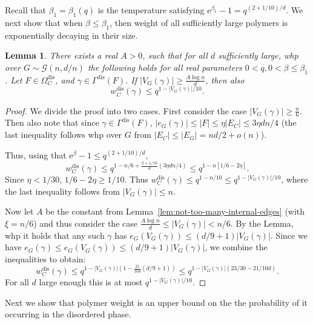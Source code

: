 \documentclass[11pt]{article}
\theoremstyle{plain}
\newtheorem{lemma}[theorem]{Lemma}
\newcommand{\G}{\mathcal{G}}
\newcommand{\emm}{\mathrm{e}}
\newcommand{\1}{\mathbb{1}}
\newcommand{\dis}{\mathrm{dis}}
\begin{document}
Recall that \(\beta_1 = \beta_1(q)\) is the temperature satisfying \(\emm^{\beta_1}-1 = q^{(2+1/10)/d}\). We next show that when \(\beta \leq \beta_1\), then weight of all sufficiently large polymers is exponentially decaying in their size. 

\begin{lemma}\label{lem:disordered-polymer-weight-decay}
    There exists a real \(A > 0\), such that for all \(d\) sufficiently large, whp over \(G\sim\G(n,d/n)\) the following holds for all real parameters \(0 <q, 0 < \beta \leq \beta_1\). Let \(F\in\Omega_C^\dis\), and \(\gamma\in\Gamma^\dis(F)\). If \(|V_G(\gamma)|\geq\frac{A\log n}{d}\), then also \[w^\dis_C(\gamma) \leq q^{1-|V_G(\gamma)|/10}.\]
\end{lemma}
\begin{proof}
    We divide the proof into two cases. First consider the case \(|V_G(\gamma)| \geq \frac{n}{6}\). Then also note that since \(\gamma\in\Gamma^\dis(F)\), \(|e_G(\gamma)|\leq |F| \leq \eta |E_C| \leq 3\eta dn / 4\) (the last inequality follows whp over \(G\) from \(|E_C|\leq|E_G| = nd/2 + o(n)\)).

    Thus, using that \(\emm^\beta-1 \leq q^{(2+1/10)/d}\),
    \[
    w^\dis_C(\gamma)\leq q^{1-n/6 + \frac{2+1/10}{d} (3\eta dn / 4)} \leq q^{1-n[1/6 - 2\eta ]}.
    \]
    Since \(\eta < 1/30\), \(1/6 - 2\eta \geq 1/10\). Thus \(w^\dis_C(\gamma)\leq q^{1-n/10}\leq q^{1-|V_G(\gamma)|/10}\), where the last inequality follows from \(|V_G(\gamma)|\leq n\).

    Now let \(A\) be the constant from Lemma~\ref{lem:not-too-many-internal-edges} (with \(\xi = n/6\)) and thus consider the case \(\frac{A\log n}{d}\leq|V_G(\gamma)| < n/6\). By the Lemma, whp it holds that any such \(\gamma\) has \(e_G(V_G(\gamma))\leq(d/9+1)|V_G(\gamma)|\).    Since we have \(e_G(\gamma) \leq e_G(V_G(\gamma)) \leq (d/9 + 1)|V_G(\gamma)|\), we combine the inequalities to obtain:
    \[
    w^\dis_C(\gamma)\leq q^{1-|V_G(\gamma)|(1 - \frac{21}{10d}(d/9+1))} \leq q^{1-|V_G(\gamma)|(23/30-21/10d)}.
    \]
    For all \(d\) large enough this is at most \(q^{1-|V_G(\gamma)|/10}\).
\end{proof}



Next we show that polymer weight is an upper bound on the the probability of it occurring in the disordered phase.
\end{document}
